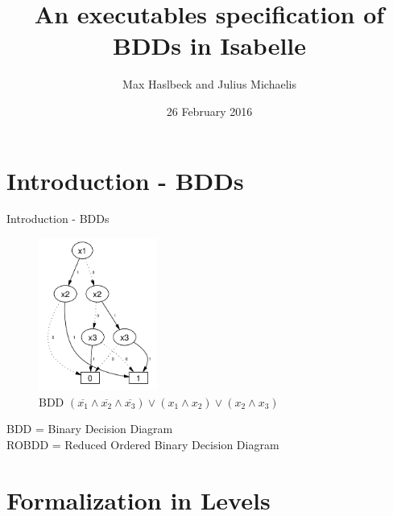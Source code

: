 \documentclass[%
	sans,
	12pt,
]{beamer}
\title{An executables specification of BDDs in Isabelle}
\author{\normalsize Max Haslbeck and Julius Michaelis}
\institute[]{\footnotesize Fakultät für Informatik\\TU München}
\date{\footnotesize 26 February 2016}
\begin{document}
\maketitle


\section{Introduction - BDDs}
\begin{frame}{Introduction - BDDs}
  \begin{center}
\begin{figure}[htbp]
  \centering
  \includegraphics[height=5cm]{img/BDD_simple.png}
  \caption{BDD $(\overline{x_1} \land \overline{x_2} \land \overline{x_3}) \lor
  (x_1 \land x_2) \lor (x_2 \land x_3) $}
\end{figure}
  BDD = Binary Decision Diagram \\
  ROBDD = Reduced Ordered Binary Decision Diagram
  \end{center}
\end{frame}


\section{Formalization in Levels}
\end{document}

